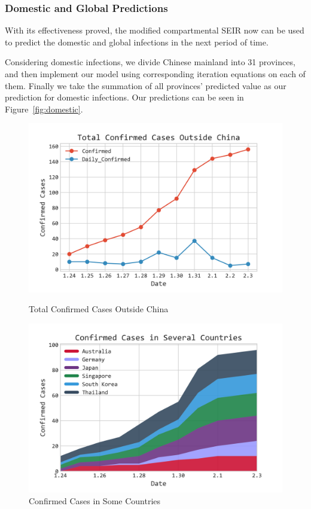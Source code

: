 \documentclass[12pt]{mcmthesis}
\begin{document}
\subsubsection{Domestic and Global Predictions} \label{subsec:pred}
With its effectiveness proved, the modified compartmental SEIR now can be used to predict the domestic and global infections in the next period of time.

Considering domestic infections, we divide Chinese mainland into 31 provinces, and then implement our model using corresponding iteration equations on each of them. Finally we take the summation of all provinces' predicted value as our prediction for domestic infections. Our predictions can be seen in Figure~\ref{fig:domestic}.

\begin{figure}[H]
    \centering
        \begin{minipage}[c]{0.48\textwidth}
            \includegraphics[width=1.0\textwidth]{figure/Global_Total.png}
            \caption{Total Confirmed Cases Outside China}
            \label{fig:Glob_Total}
        \end{minipage}
        \begin{minipage}[c]{0.48\textwidth}
            \includegraphics[width=1.0\textwidth]{figure/Global_Partial.png}
            \caption{Confirmed Cases in Some Countries}
            \label{fig:Glob_Partial}
        \end{minipage}
\end{figure}
\end{document}
